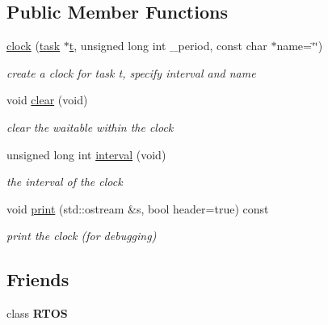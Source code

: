 \subsection*{Public Member Functions}
\begin{DoxyCompactItemize}
\item 
\hyperlink{class_r_t_o_s_1_1clock_a44aad274f5bcdee510aaf17be6845ae6}{clock} (\hyperlink{class_r_t_o_s_1_1task}{task} $\ast$\hyperlink{class_r_t_o_s_1_1event_a1402687edb26c1d5d26e54dbda21919d}{t}, unsigned long int \+\_\+period, const char $\ast$name=\char`\"{}\char`\"{})
\begin{DoxyCompactList}\small\item\em create a clock for task t, specify interval and name \end{DoxyCompactList}\item 
void \hyperlink{class_r_t_o_s_1_1clock_a90d7c2b274fff1b43a1de08e742c41c3}{clear} (void)
\begin{DoxyCompactList}\small\item\em clear the waitable within the clock \end{DoxyCompactList}\item 
unsigned long int \hyperlink{class_r_t_o_s_1_1clock_a3ea95e4a1ed3507186493a8f2a7d76ac}{interval} (void)\hypertarget{class_r_t_o_s_1_1clock_a3ea95e4a1ed3507186493a8f2a7d76ac}{}\label{class_r_t_o_s_1_1clock_a3ea95e4a1ed3507186493a8f2a7d76ac}

\begin{DoxyCompactList}\small\item\em the interval of the clock \end{DoxyCompactList}\item 
void \hyperlink{class_r_t_o_s_1_1clock_ad2d6da1595d84cbcc93cb73ed888a72a}{print} (std\+::ostream \&s, bool header=true) const \hypertarget{class_r_t_o_s_1_1clock_ad2d6da1595d84cbcc93cb73ed888a72a}{}\label{class_r_t_o_s_1_1clock_ad2d6da1595d84cbcc93cb73ed888a72a}

\begin{DoxyCompactList}\small\item\em print the clock (for debugging) \end{DoxyCompactList}\end{DoxyCompactItemize}
\subsection*{Friends}
\begin{DoxyCompactItemize}
\item 
class {\bfseries R\+T\+OS}\hypertarget{class_r_t_o_s_1_1clock_aa5b30b5b619f01a5d94b779bf0e58610}{}\label{class_r_t_o_s_1_1clock_aa5b30b5b619f01a5d94b779bf0e58610}

\end{DoxyCompactItemize}
